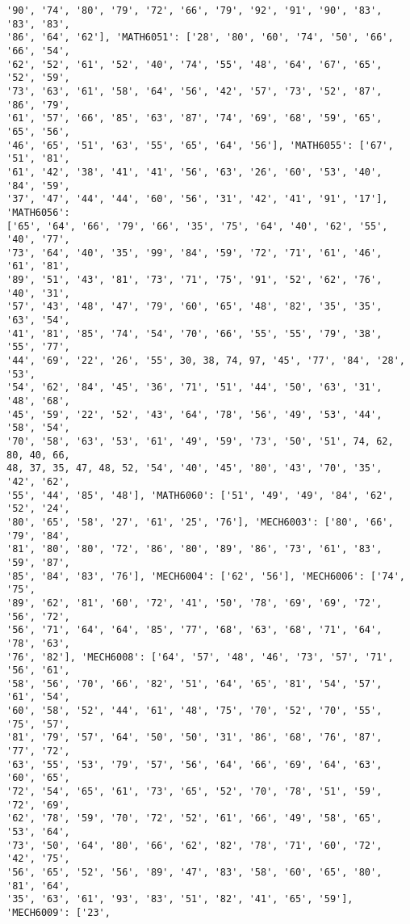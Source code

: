 \documentclass[11pt]{article}
\begin{document}
\begin{Verbatim}[commandchars=\\\{\}]
'90', '74', '80', '79', '72', '66', '79', '92', '91', '90', '83', '83', '83',
'86', '64', '62'], 'MATH6051': ['28', '80', '60', '74', '50', '66', '66', '54',
'62', '52', '61', '52', '40', '74', '55', '48', '64', '67', '65', '52', '59',
'73', '63', '61', '58', '64', '56', '42', '57', '73', '52', '87', '86', '79',
'61', '57', '66', '85', '63', '87', '74', '69', '68', '59', '65', '65', '56',
'46', '65', '51', '63', '55', '65', '64', '56'], 'MATH6055': ['67', '51', '81',
'61', '42', '38', '41', '41', '56', '63', '26', '60', '53', '40', '84', '59',
'37', '47', '44', '44', '60', '56', '31', '42', '41', '91', '17'], 'MATH6056':
['65', '64', '66', '79', '66', '35', '75', '64', '40', '62', '55', '40', '77',
'73', '64', '40', '35', '99', '84', '59', '72', '71', '61', '46', '61', '81',
'89', '51', '43', '81', '73', '71', '75', '91', '52', '62', '76', '40', '31',
'57', '43', '48', '47', '79', '60', '65', '48', '82', '35', '35', '63', '54',
'41', '81', '85', '74', '54', '70', '66', '55', '55', '79', '38', '55', '77',
'44', '69', '22', '26', '55', 30, 38, 74, 97, '45', '77', '84', '28', '53',
'54', '62', '84', '45', '36', '71', '51', '44', '50', '63', '31', '48', '68',
'45', '59', '22', '52', '43', '64', '78', '56', '49', '53', '44', '58', '54',
'70', '58', '63', '53', '61', '49', '59', '73', '50', '51', 74, 62, 80, 40, 66,
48, 37, 35, 47, 48, 52, '54', '40', '45', '80', '43', '70', '35', '42', '62',
'55', '44', '85', '48'], 'MATH6060': ['51', '49', '49', '84', '62', '52', '24',
'80', '65', '58', '27', '61', '25', '76'], 'MECH6003': ['80', '66', '79', '84',
'81', '80', '80', '72', '86', '80', '89', '86', '73', '61', '83', '59', '87',
'85', '84', '83', '76'], 'MECH6004': ['62', '56'], 'MECH6006': ['74', '75',
'89', '62', '81', '60', '72', '41', '50', '78', '69', '69', '72', '56', '72',
'56', '71', '64', '64', '85', '77', '68', '63', '68', '71', '64', '78', '63',
'76', '82'], 'MECH6008': ['64', '57', '48', '46', '73', '57', '71', '56', '61',
'58', '56', '70', '66', '82', '51', '64', '65', '81', '54', '57', '61', '54',
'60', '58', '52', '44', '61', '48', '75', '70', '52', '70', '55', '75', '57',
'81', '79', '57', '64', '50', '50', '31', '86', '68', '76', '87', '77', '72',
'63', '55', '53', '79', '57', '56', '64', '66', '69', '64', '63', '60', '65',
'72', '54', '65', '61', '73', '65', '52', '70', '78', '51', '59', '72', '69',
'62', '78', '59', '70', '72', '52', '61', '66', '49', '58', '65', '53', '64',
'73', '50', '64', '80', '66', '62', '82', '78', '71', '60', '72', '42', '75',
'56', '65', '52', '56', '89', '47', '83', '58', '60', '65', '80', '81', '64',
'35', '63', '61', '93', '83', '51', '82', '41', '65', '59'], 'MECH6009': ['23',

\end{Verbatim}
\end{document}
